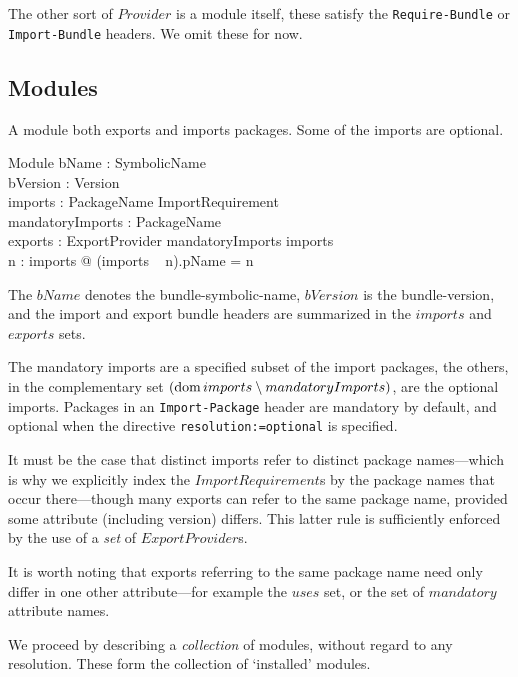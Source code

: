 \documentclass[a4paper,12pt]{article}
\begin{document}
The other sort of $Provider$ is a module itself, these satisfy the {\tt Require-Bundle} or {\tt Import-Bundle} headers. We omit these for now.

\subsection{Modules}
A module both exports and imports packages. Some of the imports are optional.
\begin{schema}{Module}
	bName : SymbolicName	\\
	bVersion : Version	\\
 	imports : PackageName \pfun ImportRequirement	\\
	mandatoryImports : \power PackageName	\\
 	exports : \power ExportProvider
 \where
 	mandatoryImports \subseteq \dom imports	\\
 	\forall n : \dom imports @ (imports ~ n).pName = n
\end{schema}
The $bName$ denotes the bundle-symbolic-name, $bVersion$ is the bundle-version, and the import and export bundle headers are summarized in the $imports$ and $exports$ sets.

The mandatory imports are a specified subset of the import packages, the others, in the complementary set $(\mathop{\mathrm{dom}} imports \setminus mandatoryImports)$, are the optional imports. Packages in an {\tt Import-Package} header are mandatory by default, and optional when the directive {\tt resolution:=optional} is specified.

It must be the case that distinct imports refer to distinct package names---which is why we explicitly index the $ImportRequirement$s by the package names that occur there---though many exports can refer to the same package name, provided some attribute (including version) differs. This latter rule is sufficiently enforced by the use of a {\it set} of $ExportProvider$s.

It is worth noting that exports referring to the same package name need only differ in one other attribute---for example the $uses$ set, or the set of $mandatory$ attribute names.

We proceed by describing a \emph{collection} of modules, without regard to any resolution. These form the collection of `installed' modules.
\end{document}
